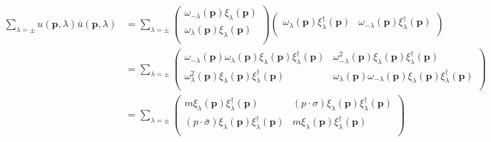 \begin{equation}
    \begin{aligned}
        \sum_{\lambda =\pm}{u}\left( \mathbf{p},\lambda \right) \bar{u}\left( \mathbf{p},\lambda \right) &=\sum_{\lambda =\pm}{\left( \begin{array}{c}
	\omega _{-\lambda}\left( \mathbf{p} \right) \xi _{\lambda}\left( \mathbf{p} \right)\\
	\omega _{\lambda}\left( \mathbf{p} \right) \xi _{\lambda}\left( \mathbf{p} \right)\\
\end{array} \right)}\left( \begin{matrix}
	\omega _{\lambda}\left( \mathbf{p} \right) \xi _{\lambda}^{\dagger}\left( \mathbf{p} \right)&		\omega _{-\lambda}\left( \mathbf{p} \right) \xi _{\lambda}^{\dagger}\left( \mathbf{p} \right)\\
\end{matrix} \right) 
\\
&=\sum_{\lambda =\pm}{\left( \begin{matrix}
	\omega _{-\lambda}\left( \mathbf{p} \right) \omega _{\lambda}\left( \mathbf{p} \right) \xi _{\lambda}\left( \mathbf{p} \right) \xi _{\lambda}^{\dagger}\left( \mathbf{p} \right)&		\omega _{-\lambda}^{2}\left( \mathbf{p} \right) \xi _{\lambda}\left( \mathbf{p} \right) \xi _{\lambda}^{\dagger}\left( \mathbf{p} \right)\\
	\omega _{\lambda}^{2}\left( \mathbf{p} \right) \xi _{\lambda}\left( \mathbf{p} \right) \xi _{\lambda}^{\dagger}\left( \mathbf{p} \right)&		\omega _{\lambda}\left( \mathbf{p} \right) \omega _{-\lambda}\left( \mathbf{p} \right) \xi _{\lambda}\left( \mathbf{p} \right) \xi _{\lambda}^{\dagger}\left( \mathbf{p} \right)\\
\end{matrix} \right)}
\\
&=\sum_{\lambda =\pm}{\left( \begin{matrix}
	m\xi _{\lambda}\left( \mathbf{p} \right) \xi _{\lambda}^{\dagger}\left( \mathbf{p} \right)&		\left( p\cdot \sigma \right) \xi _{\lambda}\left( \mathbf{p} \right) \xi _{\lambda}^{\dagger}\left( \mathbf{p} \right)\\
	\left( p\cdot \bar{\sigma} \right) \xi _{\lambda}\left( \mathbf{p} \right) \xi _{\lambda}^{\dagger}\left( \mathbf{p} \right)&		m\xi _{\lambda}\left( \mathbf{p} \right) \xi _{\lambda}^{\dagger}\left( \mathbf{p} \right)\\
\end{matrix} \right)}
\\

\end{aligned}
\end{equation}
